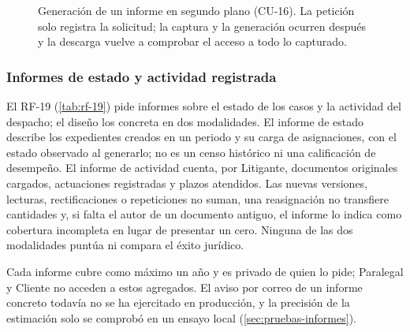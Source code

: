 \begin{figure}[htb]
  \centering
  
  \caption{Generación de un informe en segundo plano (CU-16). La petición solo
  registra la solicitud; la captura y la generación ocurren después y la descarga
  vuelve a comprobar el acceso a todo lo capturado.}
  \label{fig:cu-16}
\end{figure}

\subsubsection{Informes de estado y actividad registrada}\label{sec:diseno-informes}

El RF-19 (\cref{tab:rf-19}) pide informes sobre el estado de los casos y la
actividad del despacho; el diseño los concreta en dos modalidades. El informe
de estado describe los expedientes creados en un periodo y su carga de
asignaciones, con el estado observado al generarlo; no es un censo histórico ni
una calificación de desempeño. El informe de actividad cuenta, por Litigante,
documentos originales cargados, actuaciones registradas y plazos atendidos. Las
nuevas versiones, lecturas, rectificaciones o repeticiones no suman, una reasignación no
transfiere cantidades y, si falta el autor de un documento antiguo, el informe
lo indica como cobertura incompleta en lugar de presentar un cero. Ninguna
de las dos modalidades puntúa ni compara el éxito jurídico.

Cada informe cubre como máximo un año y es privado de quien lo pide; Paralegal
y Cliente no acceden a estos agregados. El aviso por correo de un informe
concreto todavía no se ha ejercitado en producción, y la precisión de la
estimación solo se comprobó en un ensayo local (\cref{sec:pruebas-informes}).

\label{tab:cu-17}\nopagebreak[4]
\CUcFin

